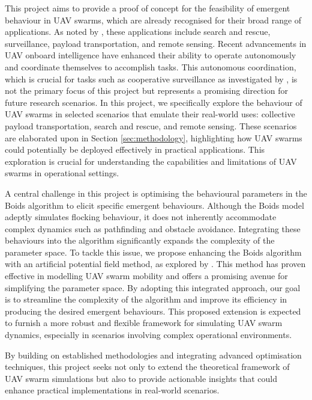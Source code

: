 \documentclass[12pt]{article}
\begin{document}
This project aims to provide a proof of concept for the feasibility of emergent behaviour in UAV swarms, which are already recognised for their broad range of applications. As noted by \citet{abdelkader2021aerial}, these applications include search and rescue, surveillance, payload transportation, and remote sensing. Recent advancements in UAV onboard intelligence have enhanced their ability to operate autonomously and coordinate themselves to accomplish tasks. This autonomous coordination, which is crucial for tasks such as cooperative surveillance as investigated by \citet{ahmadzadeh2006multi}, is not the primary focus of this project but represents a promising direction for future research scenarios. In this project, we specifically explore the behaviour of UAV swarms in selected scenarios that emulate their real-world uses: collective payload transportation, search and rescue, and remote sensing. These scenarios are elaborated upon in Section \ref{sec:methodology},  highlighting how UAV swarms could potentially be deployed effectively in practical applications. This exploration is crucial for understanding the capabilities and limitations of UAV swarms in operational settings.

A central challenge in this project is optimising the behavioural parameters in the Boids algorithm to elicit specific emergent behaviours. Although the Boids model adeptly simulates flocking behaviour, it does not inherently accommodate complex dynamics such as pathfinding and obstacle avoidance. Integrating these behaviours into the algorithm significantly expands the complexity of the parameter space. To tackle this issue, we propose enhancing the Boids algorithm with an artificial potential field method, as explored by \citet{Falomir}. This method has proven effective in modelling UAV swarm mobility and offers a promising avenue for simplifying the parameter space. By adopting this integrated approach, our goal is to streamline the complexity of the algorithm and improve its efficiency in producing the desired emergent behaviours. This proposed extension is expected to furnish a more robust and flexible framework for simulating UAV swarm dynamics, especially in scenarios involving complex operational environments.

By building on established methodologies and integrating advanced optimisation techniques, this project seeks not only to extend the theoretical framework of UAV swarm simulations but also to provide actionable insights that could enhance practical implementations in real-world scenarios.
\end{document}
